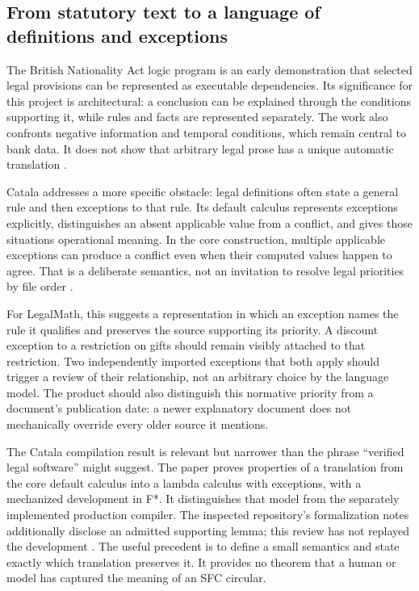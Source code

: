 \subsection{From statutory text to a language of definitions and exceptions}

The British Nationality Act logic program is an early demonstration that selected
legal provisions can be represented as executable dependencies. Its significance
for this project is architectural: a conclusion can be explained through the
conditions supporting it, while rules and facts are represented separately.
The work also confronts negative information and temporal conditions, which
remain central to bank data. It does not show that arbitrary legal prose has a
unique automatic translation \citep{sergot1986}.

Catala addresses a more specific obstacle: legal definitions often state a
general rule and then exceptions to that rule. Its default calculus represents
exceptions explicitly, distinguishes an absent applicable value from a conflict,
and gives those situations operational meaning. In the core construction,
multiple applicable exceptions can produce a conflict even when their computed
values happen to agree. That is a deliberate semantics, not an invitation to
resolve legal priorities by file order \citep[secs.~3--4]{catala2021}.

For LegalMath, this suggests a representation in which an exception names the
rule it qualifies and preserves the source supporting its priority. A discount
exception to a restriction on gifts should remain visibly attached to that
restriction. Two independently imported exceptions that both apply should trigger
a review of their relationship, not an arbitrary choice by the language model.
The product should also distinguish this normative priority from a document's
publication date: a newer explanatory document does not mechanically override
every older source it mentions.

The Catala compilation result is relevant but narrower than the phrase
``verified legal software'' might suggest. The paper proves properties of a
translation from the core default calculus into a lambda calculus with exceptions,
with a mechanized development in F*. It distinguishes that model from the
separately implemented production compiler. The inspected repository's
formalization notes additionally disclose an admitted supporting lemma; this
review has not replayed the development \citep[sec.~4]{catala2021,catalacode}.
The useful precedent is to define a small semantics and state exactly which
translation preserves it. It provides no theorem that a human or model has
captured the meaning of an SFC circular.

